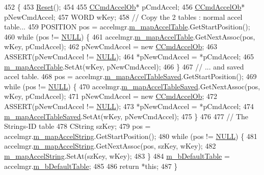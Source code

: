 \begin{DoxyCode}
452 \{
453   \mbox{\hyperlink{class_c_accelerator_manager_aca456cda1a5f9b17bcfaea4f8ff45903}{Reset}}();
454 
455   \mbox{\hyperlink{class_c_cmd_accel_ob}{CCmdAccelOb}}* pCmdAccel;
456   \mbox{\hyperlink{class_c_cmd_accel_ob}{CCmdAccelOb}}* pNewCmdAccel;
457   WORD wKey;
458   \textcolor{comment}{// Copy the 2 tables : normal accel table...}
459   POSITION pos = accelmgr.\mbox{\hyperlink{class_c_accelerator_manager_a16b8d3e9328bc0eeeb048630deff2768}{m\_mapAccelTable}}.GetStartPosition();
460   \textcolor{keywordflow}{while} (pos != \mbox{\hyperlink{getopt1_8c_a070d2ce7b6bb7e5c05602aa8c308d0c4}{NULL}}) \{
461     accelmgr.\mbox{\hyperlink{class_c_accelerator_manager_a16b8d3e9328bc0eeeb048630deff2768}{m\_mapAccelTable}}.GetNextAssoc(pos, wKey, pCmdAccel);
462     pNewCmdAccel = \textcolor{keyword}{new} \mbox{\hyperlink{class_c_cmd_accel_ob}{CCmdAccelOb}};
463     ASSERT(pNewCmdAccel != \mbox{\hyperlink{getopt1_8c_a070d2ce7b6bb7e5c05602aa8c308d0c4}{NULL}});
464     *pNewCmdAccel = *pCmdAccel;
465     \mbox{\hyperlink{class_c_accelerator_manager_a16b8d3e9328bc0eeeb048630deff2768}{m\_mapAccelTable}}.SetAt(wKey, pNewCmdAccel);
466   \}
467   \textcolor{comment}{// ... and saved accel table.}
468   pos = accelmgr.\mbox{\hyperlink{class_c_accelerator_manager_ad7c3ac9a16b8f19e0b5524d8582a5fae}{m\_mapAccelTableSaved}}.GetStartPosition();
469   \textcolor{keywordflow}{while} (pos != \mbox{\hyperlink{getopt1_8c_a070d2ce7b6bb7e5c05602aa8c308d0c4}{NULL}}) \{
470     accelmgr.\mbox{\hyperlink{class_c_accelerator_manager_ad7c3ac9a16b8f19e0b5524d8582a5fae}{m\_mapAccelTableSaved}}.GetNextAssoc(pos, wKey, pCmdAccel);
471     pNewCmdAccel = \textcolor{keyword}{new} \mbox{\hyperlink{class_c_cmd_accel_ob}{CCmdAccelOb}};
472     ASSERT(pNewCmdAccel != \mbox{\hyperlink{getopt1_8c_a070d2ce7b6bb7e5c05602aa8c308d0c4}{NULL}});
473     *pNewCmdAccel = *pCmdAccel;
474     \mbox{\hyperlink{class_c_accelerator_manager_ad7c3ac9a16b8f19e0b5524d8582a5fae}{m\_mapAccelTableSaved}}.SetAt(wKey, pNewCmdAccel);
475   \}
476 
477   \textcolor{comment}{// The Strings-ID table}
478   CString szKey;
479   pos = accelmgr.\mbox{\hyperlink{class_c_accelerator_manager_abb40dbb1a44c47ac22590e8f1243835b}{m\_mapAccelString}}.GetStartPosition();
480   \textcolor{keywordflow}{while} (pos != \mbox{\hyperlink{getopt1_8c_a070d2ce7b6bb7e5c05602aa8c308d0c4}{NULL}}) \{
481     accelmgr.\mbox{\hyperlink{class_c_accelerator_manager_abb40dbb1a44c47ac22590e8f1243835b}{m\_mapAccelString}}.GetNextAssoc(pos, szKey, wKey);
482     \mbox{\hyperlink{class_c_accelerator_manager_abb40dbb1a44c47ac22590e8f1243835b}{m\_mapAccelString}}.SetAt(szKey, wKey);
483   \}
484   \mbox{\hyperlink{class_c_accelerator_manager_ac563baf2a7cedb91bc44e9b8581a6020}{m\_bDefaultTable}} = accelmgr.\mbox{\hyperlink{class_c_accelerator_manager_ac563baf2a7cedb91bc44e9b8581a6020}{m\_bDefaultTable}};
485 
486   \textcolor{keywordflow}{return} *\textcolor{keyword}{this};
487 \}
\end{DoxyCode}
